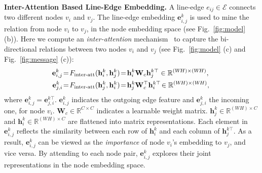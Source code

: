 \documentclass[10pt,twocolumn,letterpaper]{article}
\begin{document}
\noindent\textbf{Inter-Attention Based Line-Edge Embedding.}  A line-edge $e_{ij}\!\in\!\mathcal{E}$ connects two different nodes $v_i$ and $v_j$. The line-edge embedding $\mathbf{e}_{i,j}^k$ is used to mine the relation from node $v_i$ to $v_j$, in the node embedding space (see Fig.~\ref{fig:model} (b)).  Here we compute an \textit{inter-attention} mechanism~\cite{lu2016hierarchical} to capture the bi-directional relations between two nodes $v_i$ and $v_j$ (see Fig.~\ref{fig:model} (c) and Fig.~\ref{fig:message} (c)):
	\vspace*{-3pt}
\begin{equation}
\begin{aligned}
\!\!\mathbf{e}_{i,j}^k &\!=\! F_{\text{inter-att}}(\mathbf{h}_i^k, \mathbf{h}_j^k) \!=\! {\mathbf{h}^{k }_i} \mathbf{W}_c {\mathbf{h}_j^{k \top}} \in \mathbb{R}^{(W\!H) \times (W\!H)}, \\
\!\!\mathbf{e}_{j,i}^k &\!=\! F_{\text{inter-att}}(\mathbf{h}_j^k, \mathbf{h}_i^k) \!=\! {\mathbf{h}_j^{k }} \mathbf{W}_c^{\top}{\mathbf{h}_i^{k\top}}\!\in \mathbb{R}^{(W\!H) \times (W\!H)},
\end{aligned}
\label{edge}
\vspace*{-2pt}
\end{equation}
where $\mathbf{e}_{i,j}^k={\mathbf{e}_{j,i}^{k\top}}$. $\mathbf{e}_{i,j}^k$  indicates the outgoing edge feature and $\mathbf{e}_{j,i}^k$ the incoming one, for node $v_i$. $\mathbf{W}_{\!c\!} \in\!\mathbb{R}^{C\times C\!}$ indicates a learnable weight matrix. $\mathbf{h}^k_{j\!} \!\in\!\mathbb{R}^{{(W\!H) \times C}\!\!}$ and $\mathbf{h}^k_i \!\in\! \mathbb{R}^{{(W\!H)} \times C\!}$  are flattened into matrix representations. Each element in $\mathbf{e}^k_{i,j}$ reflects the similarity between each row of $\mathbf{h}^{k}_{i}$ and each column of $\mathbf{h}^{k\top}_{j}$. As a result, $\mathbf{e}^k_{i,j}$ can be viewed as the \textit{importance} of node $v_i$'s embedding to $v_j$, and vice versa. By attending to each node pair, $\mathbf{e}^k_{i,j}$ explores their joint representations in the node embedding space.   
\end{document}
